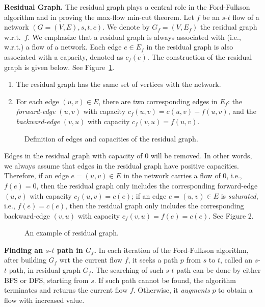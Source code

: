 {\bf Residual Graph.} The residual graph plays a central role in the Ford-Fulkson algorithm and in
proving the max-flow min-cut theorem. Let $f$ be an $s$-$t$ flow of a network
$(G = (V,E),s,t,c)$. We denote by $G_f =(V,E_f)$ the residual graph w.r.t.\ $f$. 
We emphasize that a residual graph is always associated with (i.e., w.r.t.) a flow of a network.
Each edge $e\in E_f$ in the residual graph is also associated with a capacity, denoted as $c_f(e)$. 
The construction of the residual graph is given below.  See Figure~\ref{fig:residual-graph}.
\vspace*{-\topsep}
\begin{enumerate}
\item The residual graph has the same set of vertices with the network.
\item For each edge $(u,v)\in E$, there are two corresponding edges in
$E_f$: the \emph{forward-edge} $(u,v)$ with capacity $c_f (u, v) = c(u,v) - f(u,v)$, 
and the \emph{backward-edge} $(v, u)$ with capacity $c_f (v, u) = f(u,v)$. 
\end{enumerate}

\begin{figure}[h]
\centering{}
\caption{Definition of edges and capacities of the residual graph.}
\label{fig:residual-graph}
\end{figure}

Edges in the residual graph with capacity of 0 will be removed. In other words,
we always assume that edges in the residual graph have positive
capacities. Therefore, if an edge $e = (u,v) \in E$ in the network carries a
flow of 0, i.e., $f(e) = 0$, then the residual graph only includes the
corresponding forward-edge $(u, v)$ with capacity $c_f (u, v) = c(e)$; if an
edge $e = (u, v) \in E$  is \emph{saturated}, i.e., $f (e) = c(e)$, then the residual
graph only includes the corresponding backward-edge $(v, u)$ with capacity
$c_f (v, u) = f(e) = c(e)$. See Figure 2.

\begin{figure}[h]
\centering{}
\caption{An example of residual graph.}
\label{fig:example}
\end{figure}


{\bf Finding an $s$-$t$ path in $G_f$.}
In each iteration of the Ford-Fulkson algorithm, after building $G_f$ wrt the current flow $f$,
it seeks a path $p$ from $s$ to $t$, called an $s$-$t$ path, in residual graph $G_f$.
The searching of such $s$-$t$ path can be done by either BFS or DFS, starting from $s$.
If such path cannot be found, the algorithm terminates and returns the current flow $f$.
Otherwise, it \emph{augments} $p$ to obtain a flow with increased value. 

